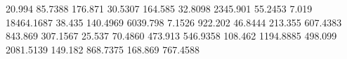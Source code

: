 


20.994   85.7388    %
176.871  30.5307    %
164.585  32.8098    %
2345.901 55.2453    %
7.019    18464.1687 %
38.435   140.4969   %
6039.798 7.1526     %
922.202  46.8444    %
213.355  607.4383   %
843.869  307.1567   %
25.537   70.4860    %
473.913  546.9358   %
108.462  1194.8885  %
498.099  2081.5139  %
149.182  868.7375   %
168.869  767.4588   %
